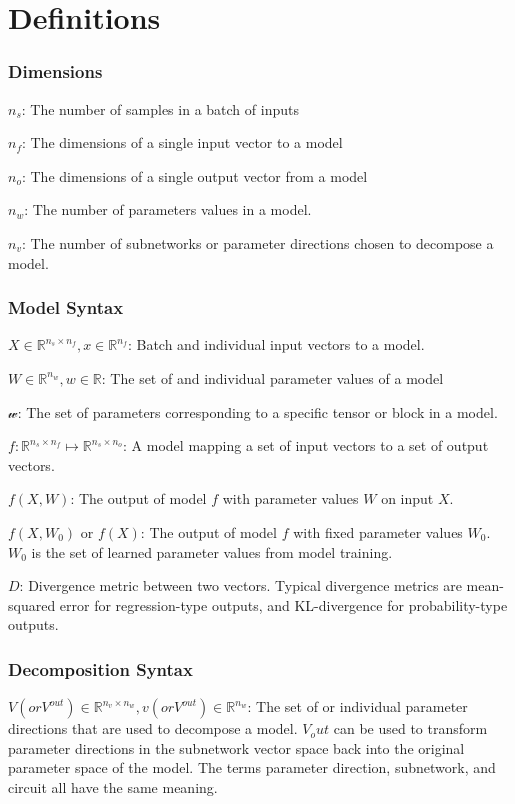 \documentclass{article}
\theoremstyle{plain}
\theoremstyle{definition}
\theoremstyle{remark}
\begin{document}
\section{Definitions}

\subsubsection{Dimensions}
$n_s$: The number of samples in a batch of inputs 

$n_f$: The dimensions of a single input vector to a model

$n_o$: The dimensions of a single output vector from a model

$n_w$: The number of parameters values in a model.

$n_v$: The number of subnetworks or parameter directions chosen to decompose a model. 


\subsubsection{Model Syntax}
$X \in \mathbb{R}^{n_s \times n_f}, x \in \mathbb{R}^{n_f}$: Batch and individual input vectors to a model.

$W \in \mathbb{R}^{n_w}, w \in \mathbb{R}$: The set of and individual parameter values of a model

$\mathcal{w}$: The set of parameters corresponding to a specific tensor or block in a model.

$f: \mathbb{R}^{n_s \times n_f} \mapsto \mathbb{R}^{n_s \times n_o}$: A model mapping a set of input vectors to a set of output vectors.

$f(X, W)$: The output of model $f$ with parameter values $W$ on input $X$.

$f(X, W_0)$ or $f(X)$: The output of model $f$ with fixed parameter values $W_0 $. $W_0$ is the set of learned parameter values from model training.

$D$: Divergence metric between two vectors. Typical divergence metrics are mean-squared error for regression-type outputs, and KL-divergence for probability-type outputs. 

\subsubsection{Decomposition Syntax}
$V (or V^{out}) \in \mathbb{R}^{n_v \times n_w}, v (or V^{out})  \in \mathbb{R}^{n_w}$: The set of or individual parameter directions that are used to decompose a model. $V_out$ can be used to transform parameter directions in the subnetwork vector space back into the original parameter space of the model. The terms parameter direction, subnetwork, and circuit all have the same meaning. 
\end{document}

